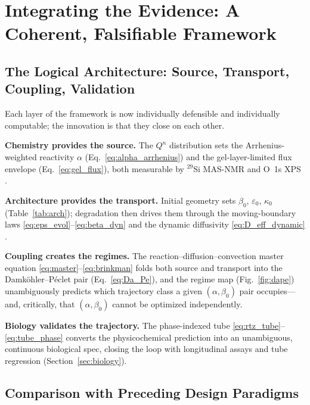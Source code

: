 \documentclass[11pt]{article}
\begin{document}
\section{Integrating the Evidence: A Coherent, Falsifiable Framework}
\label{sec:integ}


\subsection{The Logical Architecture: Source, Transport, Coupling, Validation}


Each layer of the framework is now individually defensible and individually computable; the innovation is that they close on each other.


\textbf{Chemistry provides the source.} The $Q^n$ distribution sets the Arrhenius-weighted reactivity $\alpha$ (Eq.~\eqref{eq:alpha_arrhenius}) and the gel-layer-limited flux envelope (Eq.~\eqref{eq:gel_flux}), both measurable by $^{29}$Si MAS-NMR and O~1s XPS \cite{Workie2026a,Taye2026}.


\textbf{Architecture provides the transport.} Initial geometry sets $\beta_0$, $\varepsilon_0$, $\kappa_0$ (Table~\ref{tab:arch}); degradation then drives them through the moving-boundary laws \eqref{eq:eps_evol}--\eqref{eq:beta_dyn} and the dynamic diffusivity \eqref{eq:D_eff_dynamic} \cite{VandenHeuvel2023,Tjaden2016}.


\textbf{Coupling creates the regimes.} The reaction--diffusion--convection master equation \eqref{eq:master}--\eqref{eq:brinkman} folds both source and transport into the Damk\"ohler--P\'eclet pair (Eq.~\eqref{eq:Da_Pe}), and the regime map (Fig.~\ref{fig:dape}) unambiguously predicts which trajectory class a given $(\alpha,\beta_0)$ pair occupies---and, critically, that $(\alpha,\beta_0)$ cannot be optimized independently.


\textbf{Biology validates the trajectory.} The phase-indexed tube \eqref{eq:rtz_tube}--\eqref{eq:tube_phase} converts the physicochemical prediction into an unambiguous, continuous biological spec, closing the loop with longitudinal assays and tube regression (Section~\ref{sec:biology}).


\subsection{Comparison with Preceding Design Paradigms}
\end{document}
